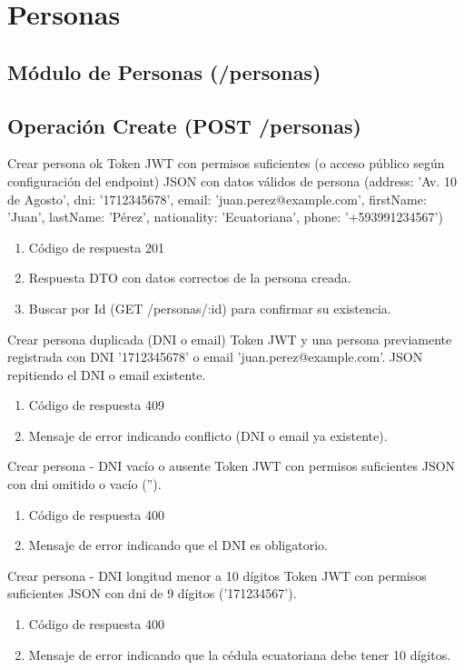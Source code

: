 \section{Personas}
\subsection{Módulo de Personas (/personas)}

\subsection{Operación Create (POST /personas)}

{Crear persona ok}
{Token JWT con permisos suficientes (o acceso público según configuración del endpoint)}
{JSON con datos válidos de persona (address: 'Av. 10 de Agosto', dni: '1712345678', email: 'juan.perez@example.com', firstName: 'Juan', lastName: 'Pérez', nationality: 'Ecuatoriana', phone: '+593991234567')}
{\begin{enumerate} [leftmargin=*, nosep]
    \item Código de respuesta 201
    \item Respuesta DTO con datos correctos de la persona creada.
    \item Buscar por Id (GET /personas/:id) para confirmar su existencia.
\end{enumerate}}

{Crear persona duplicada (DNI o email)}
{Token JWT y una persona previamente registrada con DNI '1712345678' o email 'juan.perez@example.com'.}
{JSON repitiendo el DNI o email existente.}
{\begin{enumerate} [leftmargin=*, nosep]
    \item Código de respuesta 409
    \item Mensaje de error indicando conflicto (DNI o email ya existente).
\end{enumerate}}

{Crear persona - DNI vacío o ausente}
{Token JWT con permisos suficientes}
{JSON con dni omitido o vacío ('').}
{\begin{enumerate} [leftmargin=*, nosep]
    \item Código de respuesta 400
    \item Mensaje de error indicando que el DNI es obligatorio.
\end{enumerate}}

{Crear persona - DNI longitud menor a 10 dígitos}
{Token JWT con permisos suficientes}
{JSON con dni de 9 dígitos ('171234567').}
{\begin{enumerate} [leftmargin=*, nosep]
    \item Código de respuesta 400
    \item Mensaje de error indicando que la cédula ecuatoriana debe tener 10 dígitos.
\end{enumerate}}

